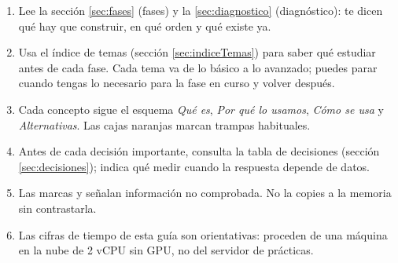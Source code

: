 \begin{titlepage}
\vspace{0.4cm}
\begin{nota}\small
\begin{enumerate}[leftmargin=*]
\item Lee la sección \ref{sec:fases} (fases) y la \ref{sec:diagnostico} (diagnóstico): te dicen qué hay que construir, en qué orden y qué existe ya.
\item Usa el índice de temas (sección \ref{sec:indiceTemas}) para saber qué estudiar antes de cada fase. Cada tema va de lo básico a lo avanzado; puedes parar cuando tengas lo necesario para la fase en curso y volver después.
\item Cada concepto sigue el esquema \emph{Qué es}, \emph{Por qué lo usamos}, \emph{Cómo se usa} y \emph{Alternativas}. Las cajas naranjas marcan trampas habituales.
\item Antes de cada decisión importante, consulta la tabla de decisiones (sección \ref{sec:decisiones}); indica qué medir cuando la respuesta depende de datos.
\item Las marcas \pv{} y \supuesto{} señalan información no comprobada. No la copies a la memoria sin contrastarla.
\item Las cifras de tiempo de esta guía son orientativas: proceden de una máquina en la nube de 2 vCPU sin GPU, no del servidor de prácticas.
\end{enumerate}
\end{nota}
\end{titlepage}
\setcounter{page}{2}

\tableofcontents
\clearpage
